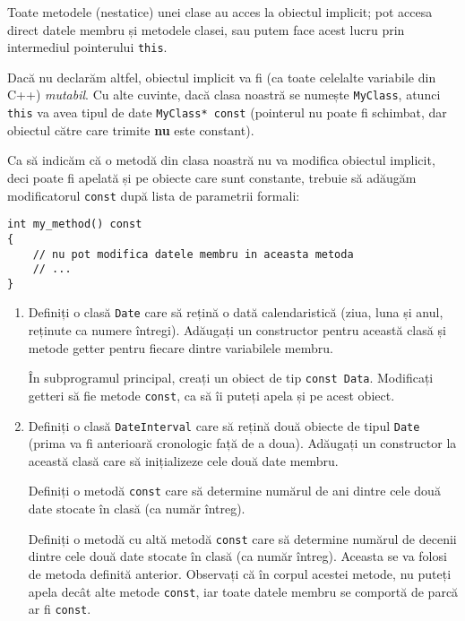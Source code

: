 Toate metodele (nestatice) unei clase au acces la obiectul implicit; pot accesa direct datele membru și metodele clasei, sau putem face acest lucru prin intermediul pointerului \texttt{this}.

Dacă nu declarăm altfel, obiectul implicit va fi (ca toate celelalte variabile din C++) \emph{mutabil}. Cu alte cuvinte, dacă clasa noastră se numește \texttt{MyClass}, atunci \texttt{this} va avea tipul de date \texttt{MyClass* const} (pointerul nu poate fi schimbat, dar obiectul către care trimite \textbf{nu} este constant).

Ca să indicăm că o metodă din clasa noastră nu va modifica obiectul implicit, deci poate fi apelată și pe obiecte care sunt constante, trebuie să adăugăm modificatorul \texttt{const} după lista de parametrii formali:
\begin{lstlisting}
int my_method() const
{
    // nu pot modifica datele membru in aceasta metoda
    // ...
}
\end{lstlisting}

\begin{enumerate}
    \item Definiți o clasă \texttt{Date} care să rețină o dată calendaristică (ziua, luna și anul, reținute ca numere întregi). Adăugați un constructor pentru această clasă și metode getter pentru fiecare dintre variabilele membru.

    În subprogramul principal, creați un obiect de tip \texttt{const Data}. Modificați getteri să fie metode \texttt{const}, ca să îi puteți apela și pe acest obiect.

    \item Definiți o clasă \texttt{DateInterval} care să rețină două obiecte de tipul \texttt{Date} (prima va fi anterioară cronologic față de a doua). Adăugați un constructor la această clasă care să inițializeze cele două date membru.

    Definiți o metodă \texttt{const} care să determine numărul de ani dintre cele două date stocate în clasă (ca număr întreg).

    Definiți o metodă cu altă metodă \texttt{const} care să determine numărul de decenii dintre cele două date stocate în clasă (ca număr întreg). Aceasta se va folosi de metoda definită anterior. Observați că în corpul acestei metode, nu puteți apela decât alte metode \texttt{const}, iar toate datele membru se comportă de parcă ar fi \texttt{const}.
\end{enumerate}